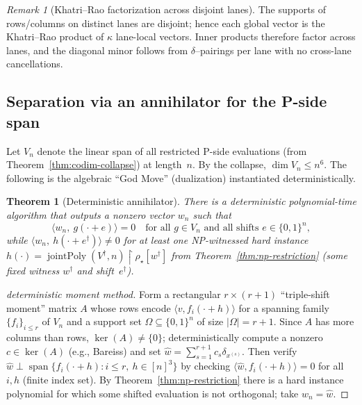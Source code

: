 \documentclass[12pt]{article}
\newtheorem{theorem}{Theorem}
\theoremstyle{definition}
\theoremstyle{definition}
\theoremstyle{remark}
\newtheorem{remark}{Remark}
\theoremstyle{remark}
\begin{document}
\begin{remark}[Khatri--Rao factorization across disjoint lanes]
The supports of rows/columns on distinct lanes are disjoint; hence each global vector is the
Khatri--Rao product of $\kappa$ lane-local vectors. Inner products therefore factor across lanes, and the
diagonal minor follows from $\delta$--pairings per lane with no cross-lane cancellations.
\end{remark}

\subsection{Separation via an annihilator for the P-side span}

Let $V_n$ denote the linear span of all restricted P-side evaluations (from Theorem~\ref{thm:codim-collapse}) at length~$n$. By the collapse, $\dim V_n\le n^6$. The following is the algebraic ``God Move'' (dualization) instantiated deterministically.

\begin{theorem}[Deterministic annihilator]\label{thm:annihilator}
There is a deterministic polynomial-time algorithm that outputs a nonzero vector $w_n$ such that
\[
\langle w_n,\ g(\cdot+e)\rangle = 0\quad\text{for all }g\in V_n\text{ and all shifts }e\in\{0,1\}^n,
\]
while $\langle w_n,\ h(\cdot+e^\dagger)\rangle\neq 0$ for at least one NP-witnessed hard instance $h(\cdot)=\operatorname{jointPoly}(V^\dagger,n)\!\upharpoonright\!\rho_\star[w^\dagger]$ from Theorem~\ref{thm:np-restriction} (some fixed witness $w^\dagger$ and shift~$e^\dagger$).
\end{theorem}

\begin{proof}[deterministic moment method]
Form a rectangular $r\times(r+1)$ ``triple-shift moment'' matrix $A$ whose rows encode $\langle v,f_i(\cdot+h)\rangle$ for a spanning family $\{f_i\}_{i\le r}$ of $V_n$ and a support set $\Omega\subseteq\{0,1\}^n$ of size $|\Omega|=r+1$. Since $A$ has more columns than rows, $\ker(A)\neq\{0\}$; deterministically compute a nonzero $c\in\ker(A)$ (e.g., Bareiss) and set $\hat w=\sum_{s=1}^{r+1}c_s\delta_{x^{(s)}}$. Then verify $\hat w\perp \operatorname{span}\{f_i(\cdot+h):i\le r,\ h\in[n]^3\}$ by checking $\langle \hat w,f_i(\cdot+h)\rangle=0$ for all $i,h$ (finite index set). By Theorem~\ref{thm:np-restriction} there is a hard instance polynomial for which some shifted evaluation is not orthogonal; take $w_n=\hat w$.
\end{proof}
\end{document}
